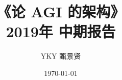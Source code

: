 \documentclass[15pt]{beamer}
\title[On AGI architecture]{\Huge《论 AGI 的架构》\\{\footnotesize 2019年 中期报告}} %
\author{YKY 甄景贤} %
\institute[] %
{
Independent researcher, Hong Kong \\ %
\medskip
\textit{generic.intelligence@gmail.com} %
}
\date{\today} %
\begin{document}
\frame{\titlepage}


%
%




\end{document}
